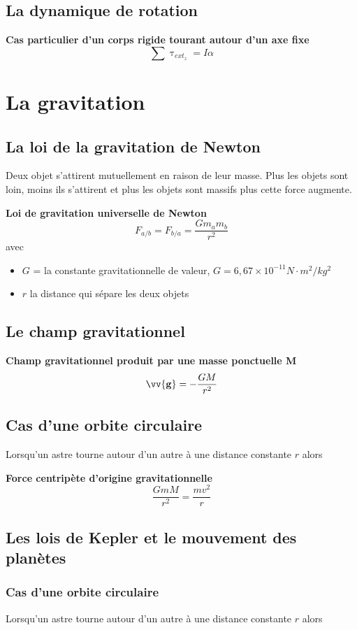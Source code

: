 \documentclass{article}
\begin{document}
\subsection{La dynamique de rotation}
\textbf{Cas particulier d'un corps rigide tourant autour d'un axe fixe}
\[\sum\uptau_{ext_z}=I\alpha\]

\section{La gravitation}
\subsection{La loi de la gravitation de Newton}
Deux objet s'attirent mutuellement en raison de leur masse. Plus les objets sont loin, moins ils s'attirent et plus les objets sont massifs plus cette force augmente.
\newline

\noindent
\textbf{Loi de gravitation universelle de Newton}
\[F_{a/b} = F_{b/a} = \frac{Gm_am_b}{r^2}\]
avec 
\begin{itemize}
    \item $G$ = la constante gravitationnelle de valeur, $G = 6,67\times10^{-11}N\cdot m^2/kg^2$
    \item $r$ la distance qui sépare les deux objets
\end{itemize}

\subsection{Le champ gravitationnel}
\textbf{Champ gravitationnel produit par une masse ponctuelle M}
\[\vv{\mathbf{g}} = -\frac{GM}{r^2}\]

\subsection{Cas d'une orbite circulaire}
Lorsqu'un astre tourne autour d'un autre à une distance constante $r$ alors
\newline

\noindent
\textbf{Force centripète d'origine gravitationnelle}
\[\frac{GmM}{r^2} = \frac{mv^2}{r}\]

\subsection{Les lois de Kepler et le mouvement des planètes}
\subsubsection{Cas d'une orbite circulaire}
Lorsqu'un astre tourne autour d'un autre à une distance constante $r$ alors
\newline
\end{document}
